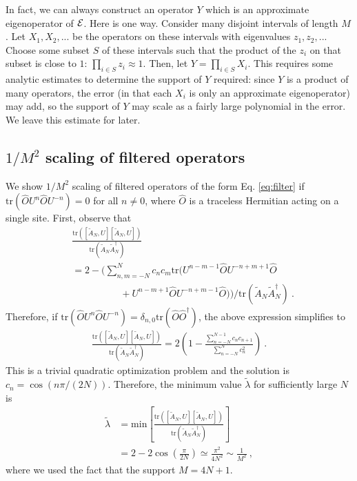 \documentclass[twocolumn,superscriptaddress, prb]{revtex4-1}
\begin{document}
In fact, we can always construct an operator $Y$ which is an approximate eigenoperator of ${\cal E}$.  Here is one way.  Consider many disjoint intervals of length $M$.  Let $X_1,X_2,...$ be the operators on these intervals with eigenvalues $z_1,z_2,...$  Choose some subset $S$ of these intervals such that the product of the $z_i$ on that subset is close to $1$: $\prod_{i \in S} z_i \approx 1$.  Then, let $Y=\prod_{i \in S} X_i$.  This requires some analytic estimates to determine the support of $Y$ required: since $Y$ is a product of many operators, the error (in that each $X_i$ is only an approximate eigenoperator) may add, so the support of $Y$ may scale as a fairly large polynomial in the error.  We leave this estimate for later.

\subsection{$1/M^2$ scaling of filtered operators}
We show $1/M^2$ scaling of filtered operators of the form Eq. \eqref{eq:filter} if $\mathrm{tr}(\hat{O}U^n \hat{O}U^{-n}) = 0$ for all $n\neq 0$,
where $\hat{O}$ is a traceless Hermitian acting on a single site.
First, observe that
\begin{align}
& \frac{\mathrm{tr}([\tilde{A}_N,U][\tilde{A}_N,U])}{\mathrm{tr}(\tilde{A}_N\tilde{A}_N^\dag)} \nonumber\\
&=2 - \bigg(\sum_{n,m = -N}^{N}c_n c_m \mathrm{tr}(U^{n-m-1}\hat{O}U^{-n+m+1}\hat{O} \nonumber\\
&\quad\quad\quad\quad\quad + U^{n-m+1}\hat{O}U^{-n+m-1}\hat{O})\bigg)/\mathrm{tr}(\tilde{A}_N\tilde{A}_N^\dag) ~.
\end{align}
Therefore, if $\mathrm{tr}(\hat{O}U^n \hat{O}U^{-n}) = \delta_{n,0}\mathrm{tr}(\hat{O}\hat{O}^\dag)$,
the above expression simplifies to
\begin{align}
\frac{\mathrm{tr}([\tilde{A}_N,U][\tilde{A}_N,U])}{\mathrm{tr}(\tilde{A}_N\tilde{A}_N^\dag)}=2\left(1 - \frac{\sum_{n=-N}^{N-1}c_n c_{n+1}}{\sum_{n=-N}^N c_n^2}\right) ~.
\end{align}
This is a trivial quadratic optimization problem and the solution is $c_n = \cos(n\pi/(2N))$.
Therefore, the minimum value $\tilde{\lambda}$ for sufficiently large $N$ is
\begin{align}
\tilde{\lambda} &= \mathrm{min}\left[\frac{\mathrm{tr}([\tilde{A}_N,U][\tilde{A}_N,U])}{\mathrm{tr}(\tilde{A}_N\tilde{A}_N^\dag)} \right] \nonumber\\
&= 2 - 2\cos\left(\frac{\pi}{2N}\right) \simeq \frac{\pi^2}{4N^2} \sim \frac{1}{M^2} ~,
\end{align}
where we used the fact that the support $M = 4N +1 $.
\end{document}
